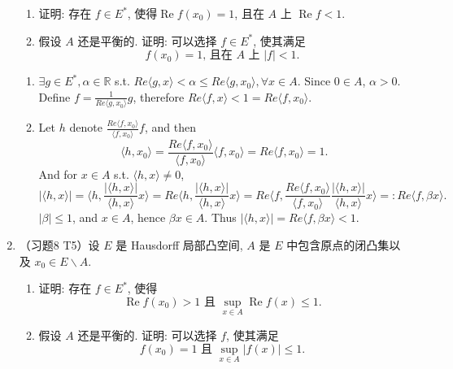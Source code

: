 \begin{enumerate}
    \begin{enumerate}
        \item 证明: 存在 $f \in E^{*}$, 使得$\operatorname{Re} f\left(x_{0}\right)=1$, 且在 $A$ 上 $\operatorname{Re} f<1$.
        \item 假设 $A$ 还是平衡的. 证明: 可以选择 $f \in E^{*}$, 使其满足
        $$
        f\left(x_{0}\right)=1 \text {, 且在 } A \text { 上 }|f|<1 \text {. }
        $$
    \end{enumerate}
    \begin{answer}
      \begin{enumerate}
        \item $\exists g\in E^*, \alpha \in \mathbb R$ s.t. $Re \langle g, x\rangle  < \alpha \leq Re \langle g, x_0\rangle, \forall x\in A$. Since $0\in A$, $\alpha >0$. Define $f = \frac1{Re\langle g, x_0\rangle}g$, therefore $Re \langle f, x\rangle  < 1 = Re\langle f, x_0\rangle$.
        \item Let $h$ denote $\frac{Re \langle f, x_0\rangle}{\langle f, x_0\rangle}f$, and then
        \[
            \langle h, x_0\rangle = \frac{Re \langle f, x_0\rangle}{\langle f, x_0\rangle}\langle f, x_0\rangle = Re \langle f, x_0\rangle = 1.
        \]
        And for $x\in A$ s.t. $\langle h, x\rangle \neq  0$,
        \[
            |\langle h, x\rangle| =
            \langle h, \frac{|\langle h, x\rangle|}{\langle h, x\rangle}x\rangle = Re\langle h, \frac{|\langle h, x\rangle|}{\langle h, x\rangle}x\rangle =
            Re\langle f, \frac{Re \langle f, x_0\rangle}{\langle f, x_0\rangle}\frac{|\langle h, x\rangle|}{\langle h, x\rangle}x\rangle=:Re\langle f, \beta x \rangle.
        \]
        $\left|\beta\right|\leq 1$, and $x\in A$, hence $\beta x\in A$. Thus $|\langle h, x\rangle| = Re\langle f,\beta x\rangle < 1$.
      \end{enumerate}
    \end{answer}
  \item （习题8 T5）设 $E$ 是 Hausdorff 局部凸空间, $A$ 是 $E$ 中包含原点的闭凸集以及 $x_{0} \in E \backslash A$.
    \begin{enumerate}
        \item 证明: 存在 $f \in E^{*}$, 使得
        $$
        \operatorname{Re} f\left(x_{0}\right)>1 \text { 且 } \sup _{x \in A} \operatorname{Re} f(x) \leqslant 1 \text {. }
        $$
        \item 假设 $A$ 还是平衡的. 证明: 可以选择 $f$, 使其满足
        $$
        f\left(x_{0}\right)=1 \text { 且 } \sup _{x \in A}|f(x)| \leqslant 1 \text {. }
        $$

\end{enumerate}
\end{enumerate}
